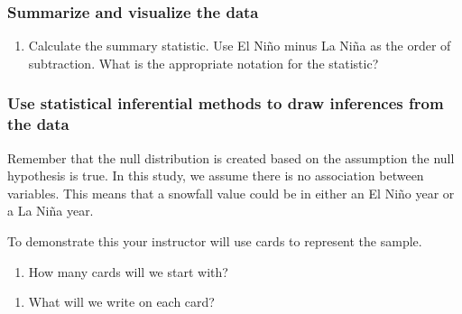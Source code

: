 \documentclass[
]{report}
\providecommand{\tightlist}{%
  \setlength{\itemsep}{0pt}\setlength{\parskip}{0pt}}
\newcommand\latexcode[1]{#1}
\begin{document}
\vspace{1in}

\hypertarget{summarize-and-visualize-the-data-3}{%
\subsubsection*{Summarize and visualize the data}\label{summarize-and-visualize-the-data-3}}

\begin{enumerate}
\def\labelenumi{\arabic{enumi}.}
\setcounter{enumi}{8}
\tightlist
\item
  Calculate the summary statistic. Use El Ni\latexcode{\~{n}}o minus La Ni\latexcode{\~{n}}a as the order of subtraction. What is the appropriate notation for the statistic?
\end{enumerate}

\vspace{0.5in}

\newpage

\hypertarget{use-statistical-inferential-methods-to-draw-inferences-from-the-data-1}{%
\subsubsection*{Use statistical inferential methods to draw inferences from the data}\label{use-statistical-inferential-methods-to-draw-inferences-from-the-data-1}}

Remember that the null distribution is created based on the assumption the null hypothesis is true. In this study, we assume there is no association between variables. This means that a snowfall value could be in either an El Ni\latexcode{\~{n}}o year or a La Ni\latexcode{\~{n}}a year.

To demonstrate this your instructor will use cards to represent the sample.

\begin{enumerate}
\def\labelenumi{\arabic{enumi}.}
\setcounter{enumi}{9}
\tightlist
\item
  How many cards will we start with?
\end{enumerate}

\vspace{0.5in}

\begin{enumerate}
\def\labelenumi{\arabic{enumi}.}
\setcounter{enumi}{10}
\tightlist
\item
  What will we write on each card?
\end{enumerate}
\end{document}
